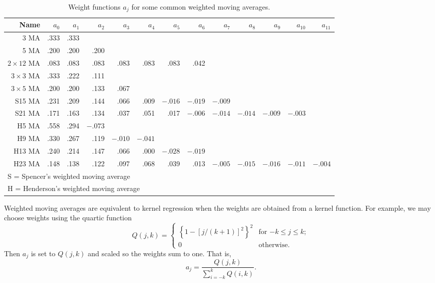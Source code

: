 \documentclass[a4paper,10pt]{article}
\begin{document}
\begin{table}[!b]
	\caption{Weight functions $a_j$ for some common weighted moving averages.}\label{table:weights}
	{\begin{small}\setlength{\tabcolsep}{0.15cm}
			\begin{tabular}{rrrrrrrrrrrrr}
				\hline
				\bf Name & $a_0$ & $a_1$ & $a_2$ & $a_3$ & $a_4$ & $a_5$ & $a_6$ & $a_7$ &
				$a_8$ & $a_9$ & $a_{10}$ & $a_{11}$ \\
				\hline
				3 MA & .333 & .333 \\
				5 MA & .200 & .200 & .200 \\
				$2\times12$ MA & .083 & .083 & .083 & .083 & .083 & .083 & .042 \\
				$3\times3$ MA & .333 & .222 & .111 \\
				$3\times5$ MA & .200 & .200 & .133 & .067 \\
				S15 MA & .231 & .209 & .144 & .066 & .009 & $-.016$ & $-.019$ & $-.009$ \\
				S21 MA & .171 & .163 & .134 & .037 & .051 & .017 & $-.006$ & $-.014$ & $-.014$ & $-.009$ & $-.003$ \\
				H5 MA & .558 & .294 & $-.073$ \\
				H9 MA & .330 & .267 & .119 & $-.010$ & $-.041$ \\
				H13 MA & .240 & .214 & .147 & .066 & .000 & $-.028$ & $-.019$ \\
				H23 MA & .148 & .138 & .122 & .097 & .068 & .039 & .013 & $-.005$ & $-.015$ & $-.016$ & $-.011$ & $-.004$ \\
				\hline
				\multicolumn{9}{l}{S = Spencer's weighted moving average} \\
				\multicolumn{9}{l}{H = Henderson's weighted moving average} \\
				\hline
			\end{tabular}\end{small}
	}\end{table}

Weighted moving averages are equivalent to kernel regression when the weights are obtained from a kernel function. For example, we may choose weights using the quartic function
\[
	Q(j,k) = \left\{\begin{array}{ll}
		\left\{1 - [j/(k+1)]^2\right\}^2 & \text{for $-k \le j \le k$}; \\
		0 & \text{otherwise.}
	\end{array}\right.
\]
Then $a_j$ is set to $Q(j,k)$ and scaled so the weights sum to one. That is,
\begin{equation}
	a_j = \frac{Q(j,k)}{\displaystyle\sum_{i=-k}^k Q(i,k)}.
	\label{eq:qweights}
\end{equation}
\end{document}
